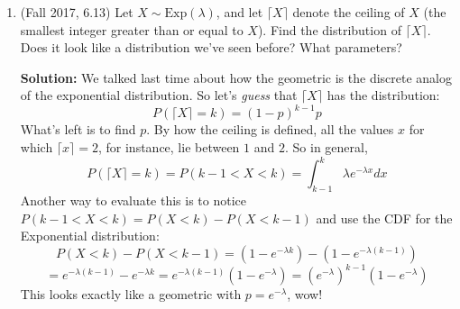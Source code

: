 \documentclass{article}
\newenvironment{solution}{

            \color{blue} \smallskip \textbf{Solution:}}{}
\begin{document}
\begin{enumerate}
\begin{enumerate}
\begin{solution}
                Now to find the PDF, we take the derivative: \[
                    f_Y(y) = n(1 - y)^{n-1}
                \]
            \end{solution}
            \item Let $Z = \text{max}(X_1, \ldots, X_{100})$. What is $E[Z]$?
            \begin{solution}
                One way to do this is as we did before. Then the the CDF of $Z$ is \[
                    P(Z \leq z) = (1 - z)^{100}
                \] so the PDF is $f_Z(z) = 100(1 - z)^{99}$. So we can find the expectation with the not-too-terrible integral: \[
                    \int_{0}^1 z \cdot 100 (1-z)^{99} dz = \frac{100}{101}\left[z^{101}\right]_0^1 = \frac{100}{101}
                \]

                Another way to do this is to notice that $X_1, \ldots X_{100}$ divide $[0, 1]$ into $101$ `compartments'. By symmetry we expect all these compartments to be the same size, and $E[Z]$ is just one minus the size of the rightmost compartment, which is $1 - \frac{1}{101} = \frac{100}{101}$.
            \end{solution}
        \end{enumerate}
        \item (Fall 2017, 6.13) Let $X \sim \text{Exp}(\lambda)$, and let $\lceil X \rceil$ denote the ceiling of $X$ (the smallest integer greater than or equal to $X$). Find the distribution of $\lceil X \rceil$.
        Does it look like a distribution we've seen before? What parameters?
        \begin{solution}
            We talked last time about how the geometric is the discrete analog of the exponential distribution. So let's \textit{guess} that $\lceil X \rceil$ has the distribution: \[
                P(\lceil X \rceil = k) = (1 - p)^{k-1} p
            \]
            What's left is to find $p$. By how the ceiling is defined, all the values $x$ for which $\lceil x \rceil = 2$, for instance, lie between $1$ and $2$. So in general, \[
                P(\lceil X \rceil = k) = P(k - 1 < X < k) = \int_{k-1}^{k} \lambda e^{-\lambda x} dx
            \]
            Another way to evaluate this is to notice $P(k - 1 < X < k) = P(X < k) - P(X < k - 1)$ and use the CDF for the Exponential distribution: \[
                P(X < k) - P(X < k - 1) = (1 - e^{-\lambda k}) - (1 - e^{-\lambda (k - 1)})
            \] \[
                = e^{- \lambda (k - 1)} - e^{- \lambda k} = e^{-\lambda (k - 1)}(1 - e^{-\lambda}) = \left(e^{-\lambda}\right)^{k-1}(1 - e^{- \lambda})
            \]
            This looks exactly like a geometric with $p = e^{-\lambda}$, wow!


\end{solution}
\end{enumerate}
\end{document}
